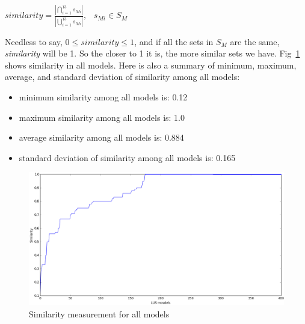 \begin{center}
$similarity = \frac{|\bigcap_{i=1}^{13} s_{Mi}|}{|\bigcup_{i=1}^{13} s_{Mi}|}, \hspace{9pt} s_{Mi} \in S_M$
\end{center}
\vspace{6pt} 

Needless to say, $0 \leq similarity \leq 1$, and if all the sets in $S_M$ are the same, \textit{similarity} will be 1. So the closer to 1 it is, the more similar sets we have. Fig~\ref{fig:sim} shows similarity in all models. Here is also a summary of minimum, maximum, average, and standard deviation of similarity among all models:
\begin{itemize}
  \item minimum similarity among all models is: 0.12
  \item maximum similarity among all models is: 1.0
  \item average similarity among all models is: 0.884
  \item standard deviation of similarity among all models is: 0.165
\end{itemize}


\begin{figure}
  \centering
  \includegraphics[width=\textwidth]{figs/similarity.png}
  \caption{\small{Similarity measurement for all models}}\label{fig:sim}
\end{figure}

\vspace{6pt}
\noindent{}
 \vspace{9pt}

